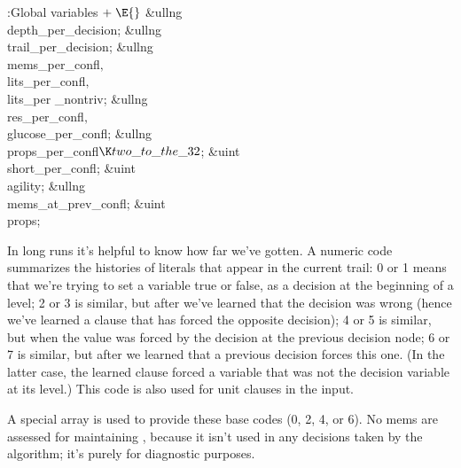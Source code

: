 \B{}:Global variables\X${}\mathrel+\E{}$\6
\&{ullng} \\{depth\_per\_decision};\6
\&{ullng} \\{trail\_per\_decision};\6
\&{ullng} \\{mems\_per\_confl}${},{}$ \\{lits\_per\_confl}${},{}$ \\{lits\_per%
\_nontriv};\6
\&{ullng} \\{res\_per\_confl}${},{}$ \\{glucose\_per\_confl};\6
\&{ullng} \\{props\_per\_confl}${}\K\\{two\_to\_the\_32}{}$;\6
\&{uint} \\{short\_per\_confl};\6
\&{uint} \\{agility};\6
\&{ullng} \\{mems\_at\_prev\_confl};\6
\&{uint} \\{props};\par
\fi

In long runs it's helpful to know how far we've gotten. A numeric code
summarizes the histories of literals that appear in the current trail:
0 or 1 means that we're trying to set a variable
true or false, as a decision at the beginning of a level;
2 or 3 is similar, but after we've learned that the decision was wrong (hence
we've learned a clause that has forced the opposite decision);
4 or 5 is similar, but when the value was forced by
the decision at the previous decision node;
6 or 7 is similar, but after we learned that a previous decision
forces this one. (In the latter case, the learned clause forced a
variable that was not the decision variable at its level.)
This code is also used for unit clauses in the input.

A special  array is used to provide these base codes (0, 2, 4,
or 6).
No mems are assessed for maintaining , because it isn't used
in any decisions taken by the algorithm; it's purely for diagnostic purposes.

